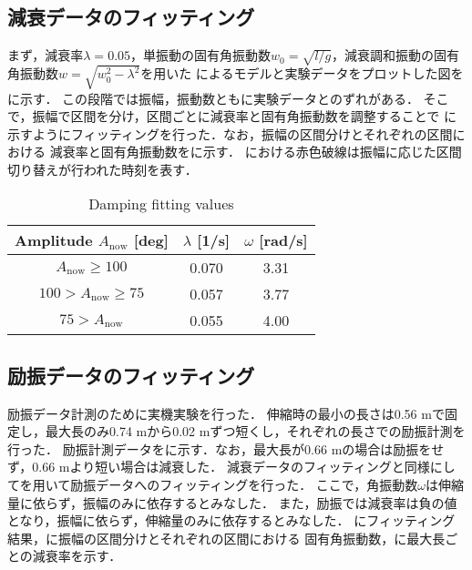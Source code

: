           \subsection{減衰データのフィッティング}
            まず，減衰率$\lambda=0.05$，単振動の固有角振動数$w_0=\sqrt{l/g}$，減衰調和振動の固有角振動数$w=\sqrt{w_{0}^2-\lambda^2}$を用いた
            によるモデルと実験データをプロットした図を\figref{}に示す．
            この段階では振幅，振動数ともに実験データとのずれがある．
            そこで，振幅で区間を分け，区間ごとに減衰率と固有角振動数を調整することで
            \figref{}に示すようにフィッティングを行った．なお，振幅の区間分けとそれぞれの区間における
            減衰率と固有角振動数をに示す．
            \figref{}における赤色破線は振幅に応じた区間切り替えが行われた時刻を表す．
            \begin{table}[tb]
              \begin{center}
                \caption{Damping fitting values}
                \vspace{2mm}
                \begin{tabular}{c|c|c}
                  \hline
                  Amplitude $A_{\mathrm{now}}$ [deg] & $\lambda$ [1/s] & $\omega$ [rad/s]\\
                  \hline
                  $A_{\mathrm{now}}\ge100$ & 0.070 & 3.31 \\
                  $100>A_{\mathrm{now}}\ge75$ & 0.057 & 3.77 \\
                  $75>A_{\mathrm{now}}$ & 0.055 & 4.00 \\                   
                  \hline
                \end{tabular}
              \end{center}
            \end{table}

          \subsection{励振データのフィッティング}
            
            励振データ計測のために実機実験を行った．
            伸縮時の最小の長さは0.56 mで固定し，最大長のみ0.74 mから0.02 mずつ短くし，それぞれの長さでの励振計測を行った．
            励振計測データを\figref{}に示す．なお，最大長が0.66 mの場合は励振をせず，0.66 mより短い場合は減衰した．
            減衰データのフィッティングと同様にしてを用いて励振データへのフィッティングを行った．
            ここで，角振動数$\omega$は伸縮量に依らず，振幅のみに依存するとみなした．
            また，励振では減衰率は負の値となり，振幅に依らず，伸縮量のみに依存するとみなした．
            \figref{}にフィッティング結果，に振幅の区間分けとそれぞれの区間における
            固有角振動数，に最大長ごとの減衰率を示す．
            
